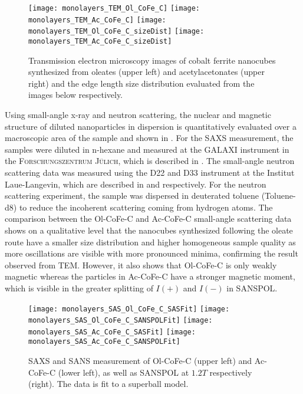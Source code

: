 \documentclass[\main/dresen_thesis.tex]{subfiles}
\begin{document}
    \begin{figure}[tb]
      \centering
      \hspace{0.3 cm}
      \texttt{[image: monolayers\_TEM\_Ol\_CoFe\_C]}
      \hspace{0.3 cm}
      \texttt{[image: monolayers\_TEM\_Ac\_CoFe\_C]}
      \texttt{[image: monolayers\_TEM\_Ol\_CoFe\_C\_sizeDist]}
      \texttt{[image: monolayers\_TEM\_Ac\_CoFe\_C\_sizeDist]}
      \caption{\label{fig:monolayers:nanoparticle:tem}Transmission electron microscopy images of cobalt ferrite nanocubes synthesized from oleates (upper left) and acetylacetonates (upper right) and the edge length size distribution evaluated from the images below respectively.}
    \end{figure}

    Using small-angle x-ray and neutron scattering, the nuclear and magnetic structure of diluted nanoparticles in dispersion is quantitatively evaluated over a macroscopic area of the sample and shown in .
    For the SAXS measurement, the samples were diluted in n-hexane and measured at the GALAXI instrument in the \textsc{Forschungszentrum J\"ulich}, which is described in .
    The small-angle neutron scattering data was measured using the D22 and D33 instrument at the Institut Laue-Langevin, which are described in  and  respectively.
    For the neutron scattering experiment, the sample was dispersed in deuterated toluene (Toluene-d8) to reduce the incoherent scattering coming from hydrogen atoms.
    The comparison between the Ol-CoFe-C and Ac-CoFe-C small-angle scattering data shows on a qualitative level that the nanocubes synthesized following the oleate route have a smaller size distribution and higher homogeneous sample quality as more oscillations are visible with more pronounced minima, confirming the result observed from TEM.
    However, it also shows that Ol-CoFe-C is only weakly magnetic whereas the particles in Ac-CoFe-C have a stronger magnetic moment, which is visible in the greater splitting of $I(+)$ and $I(-)$ in SANSPOL.

    \begin{figure}[tb]
      \centering
      \texttt{[image: monolayers\_SAS\_Ol\_CoFe\_C\_SASFit]}
      \texttt{[image: monolayers\_SAS\_Ol\_CoFe\_C\_SANSPOLFit]}
      \texttt{[image: monolayers\_SAS\_Ac\_CoFe\_C\_SASFit]}
      \texttt{[image: monolayers\_SAS\_Ac\_CoFe\_C\_SANSPOLFit]}
      \caption{\label{fig:monolayers:nanoparticle:sas:AcOlCoFeC}SAXS and SANS measurement of Ol-CoFe-C (upper left) and Ac-CoFe-C (lower left), as well as SANSPOL at $1.2 \unit{T}$ respectively (right). The data is fit to a superball model.}
    \end{figure}
\end{document}
